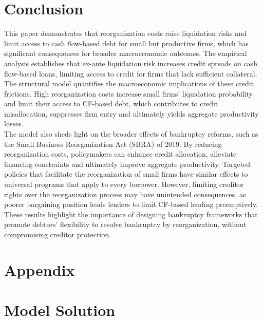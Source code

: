 \documentclass[12pt]{article}
\begin{document}
\newpage

\section{Conclusion}

This paper demonstrates that reorganization costs raise liquidation risks and limit access to cash flow-based debt for small but productive firms, which has significant consequences for broader macroeconomic outcomes. The empirical analysis establishes that ex-ante liquidation risk increases credit spreads on cash flow-based loans, limiting access to credit for firms that lack sufficient collateral. The structural model quantifies the macroeconomic implications of these credit frictions. High reorganization costs increase small firms' liquidation probability and limit their access to CF-based debt, which contributes to credit misallocation, suppresses firm entry and ultimately yields aggregate productivity losses. \vspace{3mm} \\
The model also sheds light on the broader effects of bankruptcy reforms, such as the Small Business Reorganization Act (SBRA) of 2019. By reducing reorganization costs, policymakers can enhance credit allocation, alleviate financing constraints and ultimately improve aggregate productivity. Targeted policies that facilitate the reorganization of small firms have similar effects to universal programs that apply to every borrower. However, limiting creditor rights over the reorganization process may have unintended consequences, as poorer bargaining position leads lenders to limit CF-based lending preemptively. These results highlight the importance of designing bankruptcy frameworks that promote debtors' flexibility to resolve bankruptcy by reorganization, without compromising creditor protection.

\newpage

\appendix
\section*{Appendix}
\section{Model Solution \label{sec: qualitative analysis}}
\end{document}
